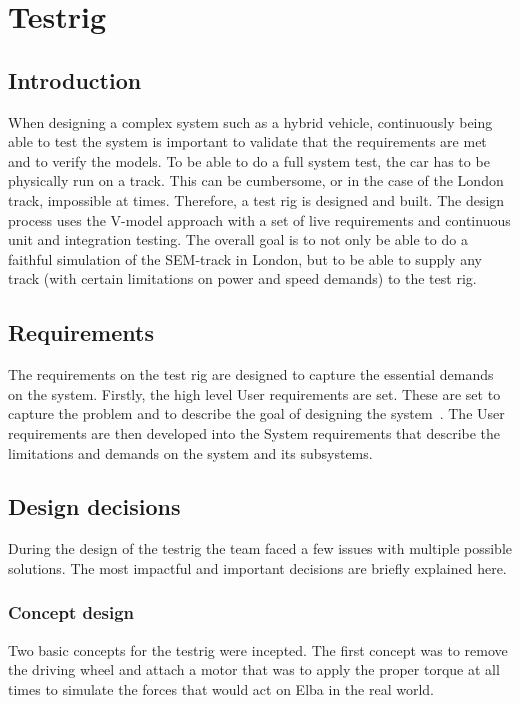 \chapter{Testrig}
\section{Introduction}
When designing a complex system such as a hybrid vehicle, continuously being
able to test the system is important to validate that the requirements are met
and to verify the models. To be able to do a full system test, the car has to be
physically run on a track. This can be cumbersome, or in the case of the London
track, impossible at times. Therefore, a test rig is designed and built. The
design process uses the V-model approach with a set of live requirements and
continuous unit and integration testing. The overall goal is to not only be able to do a faithful simulation of the SEM-track in London, but to be able to supply any track (with certain limitations on power and speed demands) to the test rig.

\section{Requirements}
The requirements on the test rig are designed to capture the essential demands
on the system. Firstly, the high level User requirements are set. These are set
to capture the problem and to describe the goal of designing the
system~\cite{ibm_req}. The User requirements are then developed into the System
requirements that describe the limitations and demands on the system and its
subsystems.

\section{Design decisions}
During the design of the testrig the team faced a few issues with multiple possible solutions. The most impactful and important decisions are briefly explained here.

\subsection{Concept design}\label{sec:testrig_design_concept}
Two basic concepts for the testrig were incepted. The first concept was to remove the driving wheel and attach a motor that was to apply the proper torque at all times to simulate the forces that would act on Elba in the real world.

